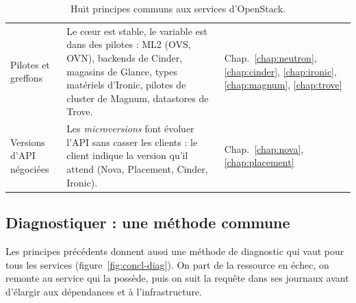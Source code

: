 \begin{table}[!ht]
\begin{tabular}{@{}>{\raggedright\arraybackslash}p{3.2cm}>{\raggedright\arraybackslash}p{9.0cm}>{\raggedright\arraybackslash}p{3.1cm}@{}}
Pilotes et greffons & Le cœur est stable, le variable est dans des pilotes : ML2 (OVS, OVN), backends de Cinder, magasins de Glance, types matériels d'Ironic, pilotes de cluster de Magnum, datastores de Trove. & Chap.~\ref{chap:neutron}, \ref{chap:cinder}, \ref{chap:ironic}, \ref{chap:magnum}, \ref{chap:trove} \\
Versions d'API négociées & Les \emph{microversions} font évoluer l'API sans casser les clients : le client indique la version qu'il attend (Nova, Placement, Cinder, Ironic). & Chap.~\ref{chap:nova}, \ref{chap:placement} \\
\bottomrule
\end{tabular}
\caption{Huit principes communs aux services d'OpenStack.}
\label{tab:concl-principes}
\end{table}

\subsection*{Diagnostiquer : une méthode commune}

Les principes précédents donnent aussi une méthode de diagnostic qui vaut pour tous les services (figure~\ref{fig:concl-diag}). On
part de la ressource en échec, on remonte au service qui la possède, puis on suit la requête dans ses journaux avant d'élargir aux
dépendances et à l'infrastructure.

